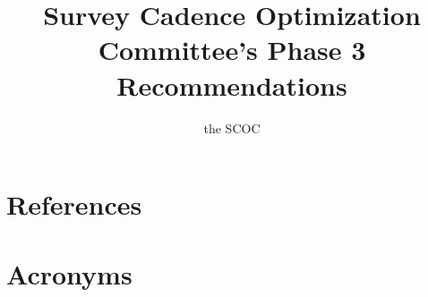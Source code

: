 \documentclass[PST,authoryear,toc,lsstdraft]{lsstdoc}
\title{Survey Cadence Optimization Committee’s Phase 3 Recommendations}
\author{%
the SCOC
}
\date{\vcsDate}
\begin{document}
\maketitle






%
%


\appendix


\section{References} \label{sec:bib}
\renewcommand{\refname}{} %


\section{Acronyms} \label{sec:acronyms}

\end{document}
